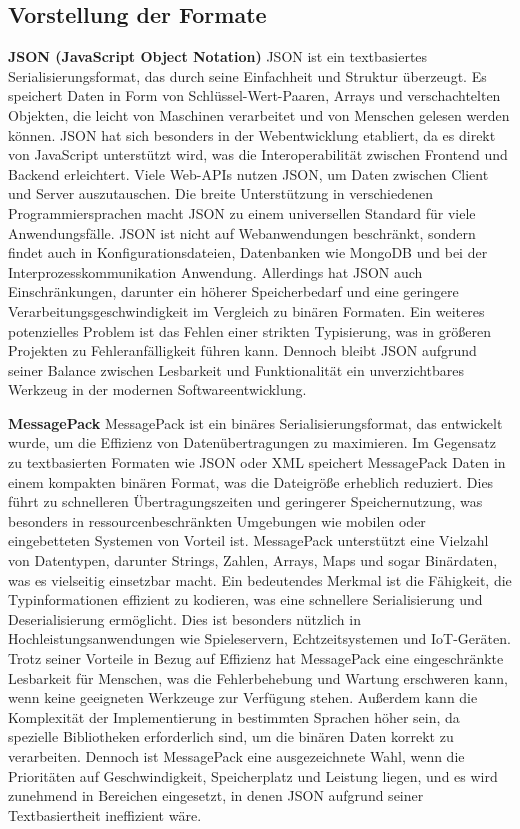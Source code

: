 \documentclass[ngerman]{seminarvorlage}
\begin{document}
\subsection{Vorstellung der Formate}

\textbf{JSON (JavaScript Object Notation)}
JSON ist ein textbasiertes Serialisierungsformat, das durch seine Einfachheit und Struktur überzeugt. Es speichert Daten in Form von Schlüssel-Wert-Paaren, Arrays und verschachtelten Objekten, die leicht von Maschinen verarbeitet und von Menschen gelesen werden können. JSON hat sich besonders in der Webentwicklung etabliert, da es direkt von JavaScript unterstützt wird, was die Interoperabilität zwischen Frontend und Backend erleichtert. Viele Web-APIs nutzen JSON, um Daten zwischen Client und Server auszutauschen. Die breite Unterstützung in verschiedenen Programmiersprachen macht JSON zu einem universellen Standard für viele Anwendungsfälle. JSON ist nicht auf Webanwendungen beschränkt, sondern findet auch in Konfigurationsdateien, Datenbanken wie MongoDB und bei der Interprozesskommunikation Anwendung. Allerdings hat JSON auch Einschränkungen, darunter ein höherer Speicherbedarf und eine geringere Verarbeitungsgeschwindigkeit im Vergleich zu binären Formaten. Ein weiteres potenzielles Problem ist das Fehlen einer strikten Typisierung, was in größeren Projekten zu Fehleranfälligkeit führen kann. Dennoch bleibt JSON aufgrund seiner Balance zwischen Lesbarkeit und Funktionalität ein unverzichtbares Werkzeug in der modernen Softwareentwicklung.

\textbf{MessagePack}
MessagePack ist ein binäres Serialisierungsformat, das entwickelt wurde, um die Effizienz von Datenübertragungen zu maximieren. Im Gegensatz zu textbasierten Formaten wie JSON oder XML speichert MessagePack Daten in einem kompakten binären Format, was die Dateigröße erheblich reduziert. Dies führt zu schnelleren Übertragungszeiten und geringerer Speichernutzung, was besonders in ressourcenbeschränkten Umgebungen wie mobilen oder eingebetteten Systemen von Vorteil ist. MessagePack unterstützt eine Vielzahl von Datentypen, darunter Strings, Zahlen, Arrays, Maps und sogar Binärdaten, was es vielseitig einsetzbar macht. Ein bedeutendes Merkmal ist die Fähigkeit, die Typinformationen effizient zu kodieren, was eine schnellere Serialisierung und Deserialisierung ermöglicht. Dies ist besonders nützlich in Hochleistungsanwendungen wie Spieleservern, Echtzeitsystemen und IoT-Geräten. Trotz seiner Vorteile in Bezug auf Effizienz hat MessagePack eine eingeschränkte Lesbarkeit für Menschen, was die Fehlerbehebung und Wartung erschweren kann, wenn keine geeigneten Werkzeuge zur Verfügung stehen. Außerdem kann die Komplexität der Implementierung in bestimmten Sprachen höher sein, da spezielle Bibliotheken erforderlich sind, um die binären Daten korrekt zu verarbeiten. Dennoch ist MessagePack eine ausgezeichnete Wahl, wenn die Prioritäten auf Geschwindigkeit, Speicherplatz und Leistung liegen, und es wird zunehmend in Bereichen eingesetzt, in denen JSON aufgrund seiner Textbasiertheit ineffizient wäre.
\end{document}
